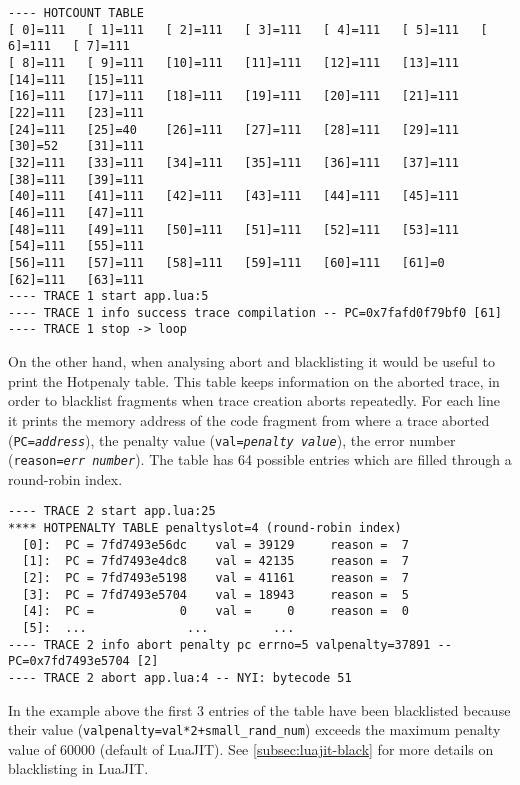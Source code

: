 \begin{lstlisting}[style=CommandsLuaJIT]
---- HOTCOUNT TABLE
[ 0]=111   [ 1]=111   [ 2]=111   [ 3]=111   [ 4]=111   [ 5]=111   [ 6]=111   [ 7]=111
[ 8]=111   [ 9]=111   [10]=111 	 [11]=111   [12]=111   [13]=111   [14]=111 	 [15]=111
[16]=111   [17]=111   [18]=111 	 [19]=111   [20]=111   [21]=111   [22]=111 	 [23]=111
[24]=111   [25]=40    [26]=111 	 [27]=111   [28]=111   [29]=111   [30]=52 	 [31]=111
[32]=111   [33]=111   [34]=111 	 [35]=111   [36]=111   [37]=111   [38]=111 	 [39]=111
[40]=111   [41]=111   [42]=111 	 [43]=111   [44]=111   [45]=111   [46]=111 	 [47]=111
[48]=111   [49]=111   [50]=111 	 [51]=111   [52]=111   [53]=111   [54]=111 	 [55]=111
[56]=111   [57]=111   [58]=111 	 [59]=111   [60]=111   [61]=0     [62]=111 	 [63]=111
---- TRACE 1 start app.lua:5
---- TRACE 1 info success trace compilation -- PC=0x7fafd0f79bf0 [61]
---- TRACE 1 stop -> loop
\end{lstlisting}

\noindent
On the other hand, when analysing abort and blacklisting it would be useful to print the Hotpenaly table. This table keeps information on the aborted trace, in order to blacklist fragments when trace creation aborts repeatedly. For each line it prints the memory address of the code fragment from where a trace aborted (\texttt{PC=\textit{address}}), the penalty value (\texttt{val=\textit{penalty value}}), the error number (\texttt{reason=\textit{err number}}). The table has 64 possible entries which are filled through a round-robin index.

\begin{lstlisting}[style=CommandsLuaJIT]
---- TRACE 2 start app.lua:25
**** HOTPENALTY TABLE penaltyslot=4 (round-robin index)
  [0]:	PC = 7fd7493e56dc	 val = 39129	 reason =  7 
  [1]:	PC = 7fd7493e4dc8	 val = 42135	 reason =  7 
  [2]:	PC = 7fd7493e5198	 val = 41161	 reason =  7 
  [3]:	PC = 7fd7493e5704	 val = 18943	 reason =  5 
  [4]:	PC =            0	 val =     0	 reason =  0 
  [5]:	... 	 	 	 ... 		 ...
---- TRACE 2 info abort penalty pc errno=5 valpenalty=37891 -- PC=0x7fd7493e5704 [2]
---- TRACE 2 abort app.lua:4 -- NYI: bytecode 51
\end{lstlisting}

\noindent
In the example above the first 3 entries of the table have been blacklisted because their value (\texttt{valpenalty=val*2+small\_rand\_num}) exceeds the maximum penalty value of 60000 (default of LuaJIT). See \ref{subsec:luajit-black} for more details on blacklisting in LuaJIT. 

